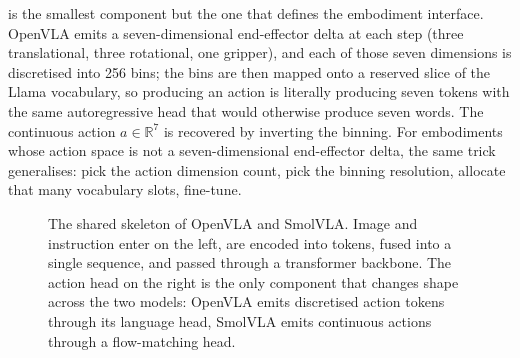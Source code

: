  is the smallest component but the one that defines the embodiment interface. OpenVLA emits a seven-dimensional end-effector delta at each step (three translational, three rotational, one gripper), and each of those seven dimensions is discretised into 256 bins; the bins are then mapped onto a reserved slice of the Llama vocabulary, so producing an action is literally producing seven tokens with the same autoregressive head that would otherwise produce seven words. The continuous action $a \in \mathbb{R}^7$ is recovered by inverting the binning. For embodiments whose action space is not a seven-dimensional end-effector delta, the same trick generalises: pick the action dimension count, pick the binning resolution, allocate that many vocabulary slots, fine-tune.

\begin{figure}
\centering
{}
\caption{The shared skeleton of OpenVLA and SmolVLA. Image and instruction enter on the left, are encoded into tokens, fused into a single sequence, and passed through a transformer backbone. The action head on the right is the only component that changes shape across the two models: OpenVLA emits discretised action tokens through its language head, SmolVLA emits continuous actions through a flow-matching head.}
\label{fig:vla_skeleton}
\end{figure}

